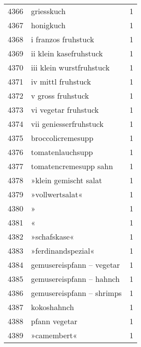 \begin{tabular}{llr}
4366 &                                         griesskuch &      1 \\
4367 &                                          honigkuch &      1 \\
4368 &                                i franzos fruhstuck &      1 \\
4369 &                             ii klein kasefruhstuck &      1 \\
4370 &                           iii klein wurstfruhstuck &      1 \\
4371 &                                 iv mittl fruhstuck &      1 \\
4372 &                                  v gross fruhstuck &      1 \\
4373 &                               vi vegetar fruhstuck &      1 \\
4374 &                             vii geniesserfruhstuck &      1 \\
4375 &                                  broccolicremesupp &      1 \\
4376 &                                   tomatenlauchsupp &      1 \\
4377 &                              tomatencremesupp sahn &      1 \\
4378 &                              »klein gemischt salat &      1 \\
4379 &                                    »vollwertsalat« &      1 \\
4380 &                                                  » &      1 \\
4381 &                                                  « &      1 \\
4382 &                                       »schafskase« &      1 \\
4383 &                                 »ferdinandspezial« &      1 \\
4384 &                          gemusereispfann – vegetar &      1 \\
4385 &                           gemusereispfann – hahnch &      1 \\
4386 &                          gemusereispfann – shrimps &      1 \\
4387 &                                        kokoshahnch &      1 \\
4388 &                                      pfann vegetar &      1 \\
4389 &                                        »camembert« &      1 \\

\end{tabular}
